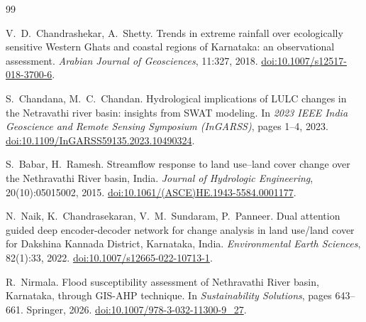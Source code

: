 \documentclass[11pt,a4paper]{article}
\begin{document}

\footnotesize
\begin{thebibliography}{99}
\setlength{\itemsep}{0pt}

V.~D.~Chandrashekar, A.~Shetty.
Trends in extreme rainfall over ecologically sensitive Western Ghats and coastal
regions of Karnataka: an observational assessment.
\emph{Arabian Journal of Geosciences}, 11:327, 2018.
\href{https://doi.org/10.1007/s12517-018-3700-6}{doi:10.1007/s12517-018-3700-6}.

S.~Chandana, M.~C.~Chandan.
Hydrological implications of LULC changes in the Netravathi river basin:
insights from SWAT modeling.
In \emph{2023 IEEE India Geoscience and Remote Sensing Symposium (InGARSS)},
pages 1--4, 2023.
\href{https://doi.org/10.1109/InGARSS59135.2023.10490324}{doi:10.1109/InGARSS59135.2023.10490324}.

S.~Babar, H.~Ramesh.
Streamflow response to land use--land cover change over the Nethravathi River
basin, India.
\emph{Journal of Hydrologic Engineering}, 20(10):05015002, 2015.
\href{https://doi.org/10.1061/(ASCE)HE.1943-5584.0001177}{doi:10.1061/(ASCE)HE.1943-5584.0001177}.

N.~Naik, K.~Chandrasekaran, V.~M.~Sundaram, P.~Panneer.
Dual attention guided deep encoder-decoder network for change analysis in land
use/land cover for Dakshina Kannada District, Karnataka, India.
\emph{Environmental Earth Sciences}, 82(1):33, 2022.
\href{https://doi.org/10.1007/s12665-022-10713-1}{doi:10.1007/s12665-022-10713-1}.

R.~Nirmala.
Flood susceptibility assessment of Nethravathi River basin, Karnataka, through
GIS-AHP technique.
In \emph{Sustainability Solutions}, pages 643--661. Springer, 2026.
\href{https://doi.org/10.1007/978-3-032-11300-9_27}{doi:10.1007/978-3-032-11300-9\_27}.


\end{thebibliography}
\end{document}
